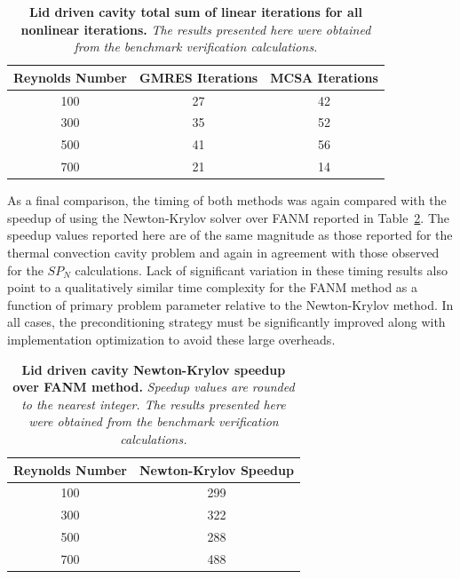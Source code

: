 \begin{table}[h!]
  \begin{center}
    \begin{tabular}{ccc}\hline\hline
      \multicolumn{1}{c}{Reynolds Number}& 
      \multicolumn{1}{c}{GMRES Iterations}&
      \multicolumn{1}{c}{MCSA Iterations}\\
      \hline
      100 & 27 & 42 \\
      300 & 35 & 52 \\
      500 & 41 & 56 \\
      700 & 21 & 14 \\
      \hline\hline
    \end{tabular}
  \end{center}
  \caption{\textbf{Lid driven cavity total sum of linear
      iterations for all nonlinear iterations.} \textit{The results
      presented here were obtained from the benchmark verification
      calculations.}}
  \label{tab:driven_linear_iter_comparison}
\end{table}

As a final comparison, the timing of both methods was again compared
with the speedup of using the Newton-Krylov solver over FANM reported
in Table~\ref{tab:driven_speedup_comparison}. The speedup values
reported here are of the same magnitude as those reported for the
thermal convection cavity problem and again in agreement with those
observed for the $SP_N$ calculations. Lack of significant variation in
these timing results also point to a qualitatively similar time
complexity for the FANM method as a function of primary problem
parameter relative to the Newton-Krylov method. In all cases, the
preconditioning strategy must be significantly improved along with
implementation optimization to avoid these large overheads.

\begin{table}[h!]
  \begin{center}
    \begin{tabular}{cc}\hline\hline
      \multicolumn{1}{c}{Reynolds Number}& 
      \multicolumn{1}{c}{Newton-Krylov Speedup}\\
      \hline
      100 & 299 \\
      300 & 322 \\
      500 & 288 \\
      700 & 488 \\
      \hline\hline
    \end{tabular}
  \end{center}
  \caption{\textbf{Lid driven cavity Newton-Krylov speedup over FANM
      method.} \textit{Speedup values are rounded to the nearest
      integer. The results presented here were obtained from the
      benchmark verification calculations.}}
  \label{tab:driven_speedup_comparison}
\end{table}

